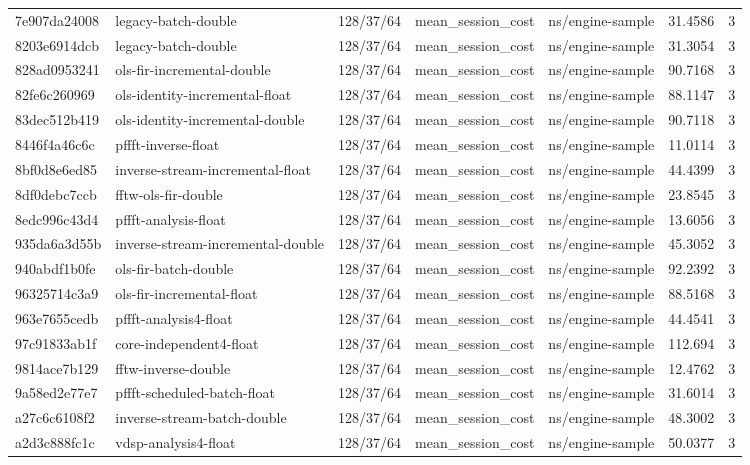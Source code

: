 \begin{longtable}{lllllrr}
7e907da24008 & legacy-batch-double & 128/37/64 & mean\_session\_cost & ns/engine-sample & 31.4586 & 3 \\
8203e6914dcb & legacy-batch-double & 128/37/64 & mean\_session\_cost & ns/engine-sample & 31.3054 & 3 \\
828ad0953241 & ols-fir-incremental-double & 128/37/64 & mean\_session\_cost & ns/engine-sample & 90.7168 & 3 \\
82fe6c260969 & ols-identity-incremental-float & 128/37/64 & mean\_session\_cost & ns/engine-sample & 88.1147 & 3 \\
83dec512b419 & ols-identity-incremental-double & 128/37/64 & mean\_session\_cost & ns/engine-sample & 90.7118 & 3 \\
8446f4a46c6c & pffft-inverse-float & 128/37/64 & mean\_session\_cost & ns/engine-sample & 11.0114 & 3 \\
8bf0d8e6ed85 & inverse-stream-incremental-float & 128/37/64 & mean\_session\_cost & ns/engine-sample & 44.4399 & 3 \\
8df0debc7ccb & fftw-ols-fir-double & 128/37/64 & mean\_session\_cost & ns/engine-sample & 23.8545 & 3 \\
8edc996c43d4 & pffft-analysis-float & 128/37/64 & mean\_session\_cost & ns/engine-sample & 13.6056 & 3 \\
935da6a3d55b & inverse-stream-incremental-double & 128/37/64 & mean\_session\_cost & ns/engine-sample & 45.3052 & 3 \\
940abdf1b0fe & ols-fir-batch-double & 128/37/64 & mean\_session\_cost & ns/engine-sample & 92.2392 & 3 \\
96325714c3a9 & ols-fir-incremental-float & 128/37/64 & mean\_session\_cost & ns/engine-sample & 88.5168 & 3 \\
963e7655cedb & pffft-analysis4-float & 128/37/64 & mean\_session\_cost & ns/engine-sample & 44.4541 & 3 \\
97c91833ab1f & core-independent4-float & 128/37/64 & mean\_session\_cost & ns/engine-sample & 112.694 & 3 \\
9814ace7b129 & fftw-inverse-double & 128/37/64 & mean\_session\_cost & ns/engine-sample & 12.4762 & 3 \\
9a58ed2e77e7 & pffft-scheduled-batch-float & 128/37/64 & mean\_session\_cost & ns/engine-sample & 31.6014 & 3 \\
a27c6c6108f2 & inverse-stream-batch-double & 128/37/64 & mean\_session\_cost & ns/engine-sample & 48.3002 & 3 \\
a2d3c888fc1c & vdsp-analysis4-float & 128/37/64 & mean\_session\_cost & ns/engine-sample & 50.0377 & 3 \\

\end{longtable}
